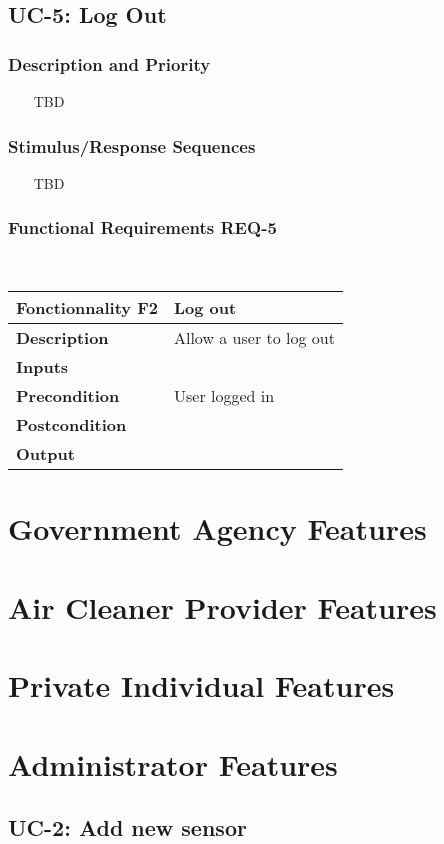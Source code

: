\documentclass{report}
\begin{document}
\subsection{UC-5: Log Out}

\subsubsection*{Description and Priority} ~~~
TBD

\subsubsection*{Stimulus/Response Sequences} ~~~
TBD

\subsubsection*{Functional Requirements REQ-5} ~~~
\begin{center}
	\begin{tabular}{|m{4cm}|m{10cm}|}
	\hline
	\textbf{Fonctionnality F2} & Log out \\
	\hline
	\textbf{Description} & Allow a user to log out  \\
	\hline
	\textbf{Inputs} &  \\
	\hline
	\textbf{Precondition} & User logged in  \\
	\hline
	\textbf{Postcondition} &  \\
	\hline
	\textbf{Output} &  \\
	\hline
	\end{tabular}
\end{center}

\section{Government Agency Features}
\section{Air Cleaner Provider Features}
\section{Private Individual Features}
\section{Administrator Features}

\subsection{UC-2: Add new sensor}
\end{document}
